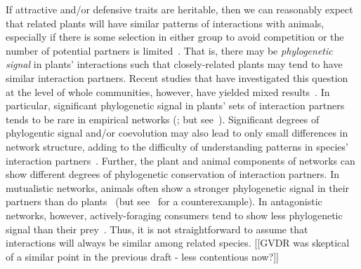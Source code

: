 \documentclass[12pt]{article}
\begin{document}
\begin{spacing}{1.5}
  If attractive and/or defensive traits are heritable,
  then we can reasonably expect that related plants will have similar 
  patterns of interactions with animals, especially if there is some selection in either group to avoid competition or the number of potential partners is limited~\citep{Schemske1999,Ponisio2017}. That is, there may be \emph{phylogenetic signal} in plants' interactions such that closely-related plants may tend to have similar interaction partners.
  Recent studies that have investigated this question at the level of whole
  communities, however, have yielded mixed results~\citep{Rezende2007a,Gomez2010,Rohr2014a,Fontaine2015,Lind2015,Ibanez2016,Bergamini2017,Sydenham2017,Volf2017,Hutchinson2017}.
  In particular, significant phylogenetic signal in plants' sets of interaction partners tends to be rare in empirical networks (\citealp{Rezende2007a,Lind2015,Ibanez2016}; but see~\citealp{Elias2013,Fontaine2015,Hutchinson2017}). Significant degrees of phylogentic signal and/or coevolution may also lead to only small differences in network structure, adding to the difficulty of understanding patterns in species' interaction partners~\citep{Ponisio2017}.
  Further, the plant and animal components of networks can show different degrees of phylogenetic conservation of interaction partners. In mutualistic networks, animals often show a stronger phylogenetic signal in their partners than do plants~\citep{Rezende2007a,Chamberlain2014,Rohr2014,Vamosi2014,Lind2015,Fontaine2015} (but see~\citep{Rafferty2013} for a counterexample). In antagonistic networks, however, actively-foraging consumers tend to show less phylogenetic signal than their prey~\citep{Ives2006,Cagnolo2011,Naisbit2011,Fontaine2015}. Thus, it is not straightforward to assume that interactions will always be similar among related species. [[GVDR was skeptical of a similar point in the previous draft - less contentious now?]]



\end{spacing}
\end{document}

